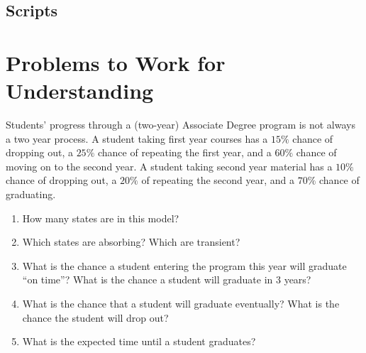 \documentclass[12pt]{article}
\begin{document}
\subsection*{Scripts}



\hr

\section*{Problems to Work for Understanding}
\renewcommand{\theexerciseseries}{}
\renewcommand{\theexercise}{\arabic{exercise}}

\begin{exercise}
    Students' progress through a (two-year) Associate Degree program is
    not always a two year process.  A student taking first year courses
    has a \( 15\% \) chance of dropping out, a \( 25\% \) chance of
    repeating the first year, and a \( 60\% \) chance of moving on to
    the second year.  A student taking second year material has a \( 10\%
    \) chance of dropping out, a \( 20\% \) of repeating the second
    year, and a \( 70\% \) chance of graduating.
    \begin{enumerate}[label=(\alph*)]
    \item
        How many states are in this model?
    \item
        Which states are absorbing?  Which are transient?
    \item
        What is the chance a student entering the program this year will
        graduate ``on time''?  What is the chance a student will
        graduate in 3 years?
    \item
        What is the chance that a student will graduate eventually?
        What is the chance the student will drop out?
    \item
        What is the expected time until a student graduates?
\end{enumerate}
\end{exercise}
\end{document}
